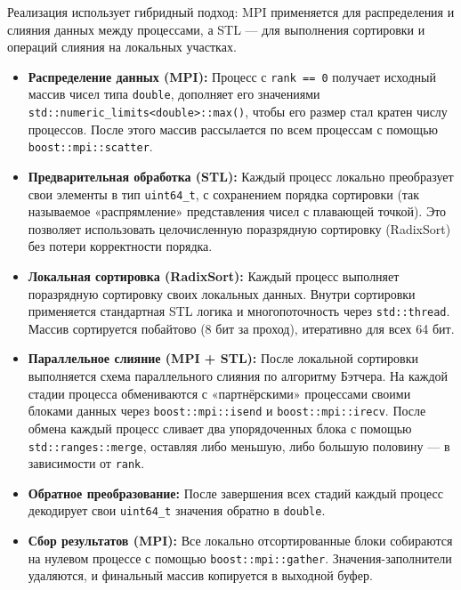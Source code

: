 \documentclass[12pt]{article}
\begin{document}
Реализация использует гибридный подход: MPI применяется для распределения и слияния данных между процессами, а STL — для выполнения сортировки и операций слияния на локальных участках.
\begin{itemize}
  \item \textbf{Распределение данных (MPI):} Процесс с \texttt{rank == 0} получает исходный массив чисел типа \texttt{double}, дополняет его значениями \texttt{std::numeric\_limits<double>::max()}, чтобы его размер стал кратен числу процессов. После этого массив рассылается по всем процессам с помощью \texttt{boost::mpi::scatter}.

  \item \textbf{Предварительная обработка (STL):} Каждый процесс локально преобразует свои элементы в тип \texttt{uint64\_t}, с сохранением порядка сортировки (так называемое «распрямление» представления чисел с плавающей точкой). Это позволяет использовать целочисленную поразрядную сортировку (RadixSort) без потери корректности порядка.

  \item \textbf{Локальная сортировка (RadixSort):} Каждый процесс выполняет поразрядную сортировку своих локальных данных. Внутри сортировки применяется стандартная STL логика и многопоточность через \texttt{std::thread}. Массив сортируется побайтово (8 бит за проход), итеративно для всех 64 бит.

  \item \textbf{Параллельное слияние (MPI + STL):} После локальной сортировки выполняется схема параллельного слияния по алгоритму Бэтчера. На каждой стадии процесса обмениваются с «партнёрскими» процессами своими блоками данных через \texttt{boost::mpi::isend} и \texttt{boost::mpi::irecv}. После обмена каждый процесс сливает два упорядоченных блока с помощью \texttt{std::ranges::merge}, оставляя либо меньшую, либо большую половину — в зависимости от \texttt{rank}.

  \item \textbf{Обратное преобразование:} После завершения всех стадий каждый процесс декодирует свои \texttt{uint64\_t} значения обратно в \texttt{double}.

  \item \textbf{Сбор результатов (MPI):} Все локально отсортированные блоки собираются на нулевом процессе с помощью \texttt{boost::mpi::gather}. Значения-заполнители удаляются, и финальный массив  копируется в выходной буфер.
\end{itemize}
\end{document}
